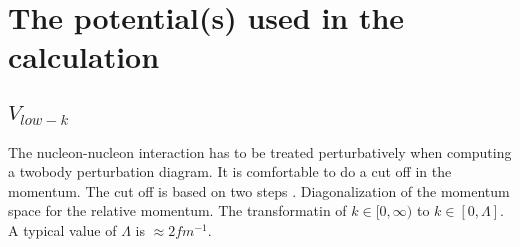 \chapter{The potential(s) used in the calculation} 

\section{$V_{low-k}$}

The nucleon-nucleon interaction has to be treated perturbatively when 
computing a twobody perturbation diagram. It is comfortable to do a cut off 
in the momentum. The cut off is based on two steps \cite{gamow}. 
Diagonalization of the momentum space for the relative momentum. The 
transformatin of $k \in [0, \infty)$ to $k \in [0, \Lambda ]$.
A typical value of $\Lambda$ is $\approx 2 fm^{-1}.$
